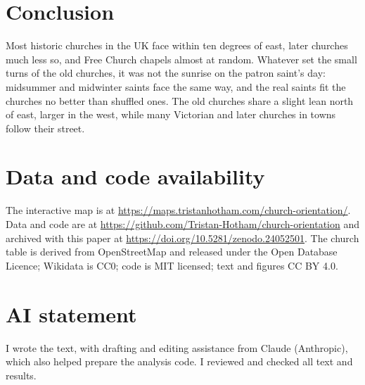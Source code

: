 \documentclass[11pt,a4paper]{article}
\begin{document}
\section{Conclusion}
Most historic churches in the UK face within ten degrees of east, later churches much less so, and Free Church chapels almost at random. Whatever set the small turns of the old churches, it was not the sunrise on the patron saint's day: midsummer and midwinter saints face the same way, and the real saints fit the churches no better than shuffled ones. The old churches share a slight lean north of east, larger in the west, while many Victorian and later churches in towns follow their street.

\section*{Data and code availability}
The interactive map is at \url{https://maps.tristanhotham.com/church-orientation/}. Data and code are at \url{https://github.com/Tristan-Hotham/church-orientation} and archived with this paper at \url{https://doi.org/10.5281/zenodo.24052501}. The church table is derived from OpenStreetMap and released under the Open Database Licence; Wikidata is CC0; code is MIT licensed; text and figures CC BY 4.0.

\section*{AI statement}
I wrote the text, with drafting and editing assistance from Claude (Anthropic), which also helped prepare the analysis code. I reviewed and checked all text and results.
\end{document}
